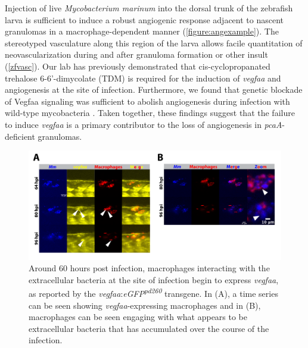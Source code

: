 Injection of live \textit{Mycobacterium marinum} into the dorsal trunk of the zebrafish larva is sufficient to induce a robust angiogenic response adjacent to nascent granulomas in a macrophage\hyp{}dependent manner \citep{Oehlers2015} (\autoref{figure:angexample}). The stereotyped vasculature along this region of the larva allows facile quantitation of neovascularization during and after granuloma formation or other insult \citep{Lawson2002, Jin2005, Gore2012, Matsuoka2018} (\autoref{zfvasc}). Our lab has previously demonstrated that cis\hyp{}cyclopropanated trehalose 6\hyp{}6'\hyp{}dimycolate (TDM) is required for the induction of \textit{vegfaa} and angiogenesis at the site of infection. Furthermore, we found that genetic blockade of Vegfaa signaling was sufficient to abolish angiogenesis during infection with wild\hyp{}type mycobacteria \citep{Walton2018}. Taken together, these findings suggest that the failure to induce \textit{vegfaa} is a primary contributor to the loss of angiogenesis in \textit{pcaA}\hyp{}deficient granulomas.

\begin{figure}
\centering
\includegraphics[width=\textwidth]{images/extracellularvegfa.pdf}
\caption[Extracellular bacterial accumulation corresponds to \textit{vegfaa} induction]{Around 60 hours post infection, macrophages interacting with the extracellular bacteria at the site of infection begin to express \textit{vegfaa}, as reported by the \textit{vegfaa}:\textit{eGFP\textsuperscript{pd260}} transgene. In (A), a time series can be seen showing \textit{vegfaa}\hyp{}expressing macrophages and in (B), macrophages can be seen engaging with what appears to be extracellular bacteria that has accumulated over the course of the infection.}
\label{figure:ecvegfa}
\end{figure}

